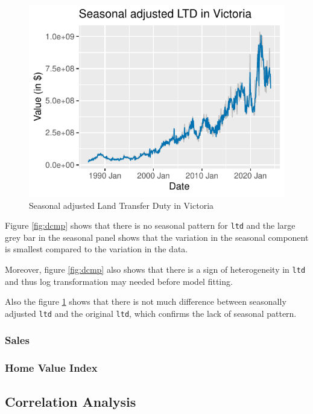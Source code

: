 \documentclass[11pt,a4paper,]{article}
\begin{document}
\begin{figure}[H]

{\centering \includegraphics{Final_Report_files/figure-latex/ssadj-1} 

}

\caption{Seasonal adjusted Land Transfer Duty in Victoria}\label{fig:ssadj}
\end{figure}

Figure \ref{fig:dcmp} shows that there is no seasonal pattern for \texttt{ltd} and the large grey bar in the seasonal panel shows that the variation in the seasonal component is smallest compared to the variation in the data.

Moreover, figure \ref{fig:dcmp} also shows that there is a sign of heterogeneity in \texttt{ltd} and thus log transformation may needed before model fitting.

Also the figure \ref{fig:ssadj} shows that there is not much difference between seasonally adjusted \texttt{ltd} and the original \texttt{ltd}, which confirms the lack of seasonal pattern.

\subsubsection{Sales}\label{sales}

\subsubsection{Home Value Index}\label{home-value-index}

\subsection{Correlation Analysis}\label{correlation-analysis}
\end{document}
